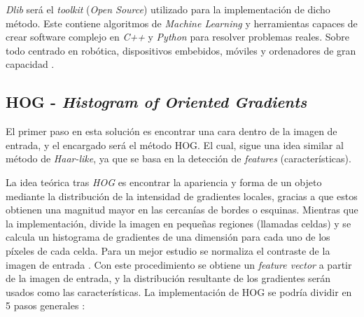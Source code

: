 \textit{Dlib} será el \textit{toolkit} (\textit{Open Source}) utilizado para la implementación de dicho método. Este contiene algoritmos de \textit{Machine Learning} y herramientas capaces de crear software complejo en \textit{C++} y \textit{Python} para resolver problemas reales. Sobre todo centrado en robótica, dispositivos embebidos, móviles y ordenadores de gran capacidad \cite{dlib}. 

\vspace{-0.7cm}
\subsection*{HOG - \textit{Histogram of Oriented Gradients}}
\vspace{-0.5cm}
El primer paso en esta solución es encontrar una cara dentro de la imagen de entrada, y el encargado será el método HOG. El cual, sigue una idea similar al método de \textit{Haar-like}, ya que se basa en la detección de \textit{features} (características).

La idea teórica tras \textit{HOG} es encontrar la apariencia y forma de un objeto mediante la distribución de la intensidad de gradientes locales, gracias a que estos obtienen una magnitud mayor en las cercanías de bordes o esquinas. Mientras que la implementación, divide la imagen en pequeñas regiones (llamadas celdas) y se calcula un histograma de gradientes de una dimensión para cada uno de los píxeles de cada celda. Para un mejor estudio se normaliza el contraste de la imagen de entrada \cite{hog}. Con este procedimiento se obtiene un \textit{feature vector} a partir de la imagen de entrada, y la distribución resultante de los gradientes serán usados como las características. La implementación de HOG se podría dividir en 5 pasos generales \cite{hog2}:

